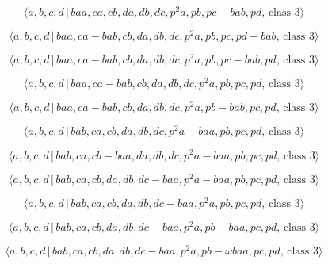 \documentclass[10pt]{article}
\begin{document}
\begin{equation}
\langle a,b,c,d\,|\,baa,ca,cb,da,db,dc,p^2a,pb,pc-bab,pd,\,\text{class }%
3\rangle  \tag{7.3625}
\end{equation}

\begin{equation}
\langle a,b,c,d\,|\,baa,ca-bab,cb,da,db,dc,p^2a,pb,pc,pd-bab,\,\text{class }%
3\rangle  \tag{7.3626}
\end{equation}

\begin{equation}
\langle a,b,c,d\,|\,baa,ca-bab,cb,da,db,dc,p^2a,pb,pc-bab,pd,\,\text{class }%
3\rangle  \tag{7.3627}
\end{equation}

\begin{equation}
\langle a,b,c,d\,|\,baa,ca-bab,cb,da,db,dc,p^2a,pb,pc,pd,\,\text{class }%
3\rangle  \tag{7.3628}
\end{equation}

\begin{equation}
\langle a,b,c,d\,|\,baa,ca-bab,cb,da,db,dc,p^2a,pb-bab,pc,pd,\,\text{class }%
3\rangle  \tag{7.3629}
\end{equation}

\begin{equation}
\langle a,b,c,d\,|\,bab,ca,cb,da,db,dc,p^2a-baa,pb,pc,pd,\,\text{class }%
3\rangle  \tag{7.3630}
\end{equation}

\begin{equation}
\langle a,b,c,d\,|\,bab,ca,cb-baa,da,db,dc,p^2a-baa,pb,pc,pd,\,\text{class }%
3\rangle  \tag{7.3631}
\end{equation}

\begin{equation}
\langle a,b,c,d\,|\,bab,ca,cb,da,db,dc-baa,p^2a-baa,pb,pc,pd,\,\text{class }%
3\rangle  \tag{7.3632}
\end{equation}

\begin{equation}
\langle a,b,c,d\,|\,bab,ca,cb,da,db,dc-baa,p^2a,pb,pc,pd,\,\text{class }%
3\rangle  \tag{7.3633}
\end{equation}

\begin{equation}
\langle a,b,c,d\,|\,bab,ca,cb,da,db,dc-baa,p^2a,pb-baa,pc,pd,\,\text{class }%
3\rangle  \tag{7.3634}
\end{equation}

\begin{equation}
\langle a,b,c,d\,|\,bab,ca,cb,da,db,dc-baa,p^{2}a,pb-\omega baa,pc,pd,\,%
\text{class }3\rangle  \tag{7.3635}
\end{equation}
\end{document}
